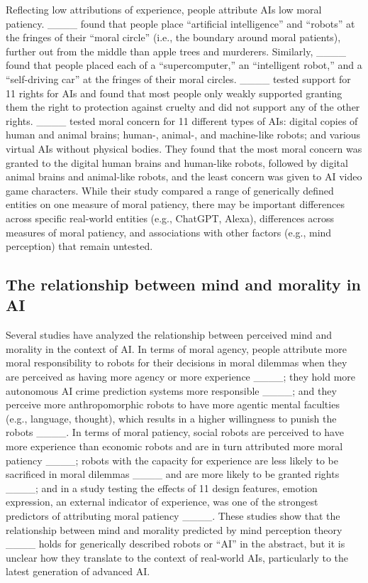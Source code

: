 Reflecting low attributions of experience, people attribute AIs low moral patiency. ____ found that people place “artificial intelligence” and “robots” at the fringes of their “moral circle” (i.e., the boundary around moral patients), further out from the middle than apple trees and murderers. Similarly, ____ found that people placed each of a “supercomputer,” an “intelligent robot,” and a “self-driving car” at the fringes of their moral circles. ____ tested support for 11 rights for AIs and found that most people only weakly supported granting them the right to protection against cruelty and did not support any of the other rights. ____ tested moral concern for 11 different types of AIs: digital copies of human and animal brains; human-, animal-, and machine-like robots; and various virtual AIs without physical bodies. They found that the most moral concern was granted to the digital human brains and human-like robots, followed by digital animal brains and animal-like robots, and the least concern was given to AI video game characters. While their study compared a range of generically defined entities on one measure of moral patiency, there may be important differences across specific real-world entities (e.g., ChatGPT, Alexa), differences across measures of moral patiency, and associations with other factors (e.g., mind perception) that remain untested.

\subsection{The relationship between mind and morality in AI}

Several studies have analyzed the relationship between perceived mind and morality in the context of AI. In terms of moral agency, people attribute more moral responsibility to robots for their decisions in moral dilemmas when they are perceived as having more agency or more experience ____; they hold more autonomous AI crime prediction systems more responsible ____; and they perceive more anthropomorphic robots to have more agentic mental faculties (e.g., language, thought), which results in a higher willingness to punish the robots ____. In terms of moral patiency, social robots are perceived to have more experience than economic robots and are in turn attributed more moral patiency ____; robots with the capacity for experience are less likely to be sacrificed in moral dilemmas ____ and are more likely to be granted rights ____; and in a study testing the effects of 11 design features, emotion expression, an external indicator of experience, was one of the strongest predictors of attributing moral patiency ____. These studies show that the relationship between mind and morality predicted by mind perception theory ____ holds for generically described robots or “AI” in the abstract, but it is unclear how they translate to the context of real-world AIs, particularly to the latest generation of advanced AI.

